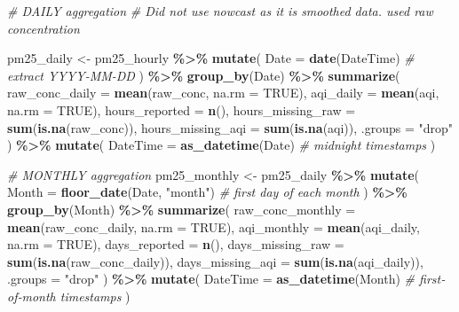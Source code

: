 \documentclass[
]{article}
\newenvironment{Shaded}{\begin{snugshade}}{\end{snugshade}}
\newcommand{\AttributeTok}[1]{\textcolor[rgb]{0.13,0.29,0.53}{#1}}
\newcommand{\CommentTok}[1]{\textcolor[rgb]{0.56,0.35,0.01}{\textit{#1}}}
\newcommand{\ConstantTok}[1]{\textcolor[rgb]{0.56,0.35,0.01}{#1}}
\newcommand{\FunctionTok}[1]{\textcolor[rgb]{0.13,0.29,0.53}{\textbf{#1}}}
\newcommand{\NormalTok}[1]{#1}
\newcommand{\OtherTok}[1]{\textcolor[rgb]{0.56,0.35,0.01}{#1}}
\newcommand{\SpecialCharTok}[1]{\textcolor[rgb]{0.81,0.36,0.00}{\textbf{#1}}}
\newcommand{\StringTok}[1]{\textcolor[rgb]{0.31,0.60,0.02}{#1}}
\begin{document}
\begin{Shaded}
\begin{Highlighting}[]
\CommentTok{\# DAILY aggregation}
\CommentTok{\# Did not use nowcast as it is smoothed data. used raw concentration}

\NormalTok{pm25\_daily }\OtherTok{\textless{}{-}}\NormalTok{ pm25\_hourly }\SpecialCharTok{\%\textgreater{}\%}
  \FunctionTok{mutate}\NormalTok{(}
    \AttributeTok{Date     =} \FunctionTok{date}\NormalTok{(DateTime)                }\CommentTok{\# extract YYYY{-}MM{-}DD}
\NormalTok{  ) }\SpecialCharTok{\%\textgreater{}\%}
  \FunctionTok{group\_by}\NormalTok{(Date) }\SpecialCharTok{\%\textgreater{}\%}
  \FunctionTok{summarize}\NormalTok{(}
    \AttributeTok{raw\_conc\_daily    =} \FunctionTok{mean}\NormalTok{(raw\_conc, }\AttributeTok{na.rm =} \ConstantTok{TRUE}\NormalTok{),}
    \AttributeTok{aqi\_daily         =} \FunctionTok{mean}\NormalTok{(aqi,      }\AttributeTok{na.rm =} \ConstantTok{TRUE}\NormalTok{),}
    \AttributeTok{hours\_reported    =} \FunctionTok{n}\NormalTok{(),}
    \AttributeTok{hours\_missing\_raw =} \FunctionTok{sum}\NormalTok{(}\FunctionTok{is.na}\NormalTok{(raw\_conc)),}
    \AttributeTok{hours\_missing\_aqi =} \FunctionTok{sum}\NormalTok{(}\FunctionTok{is.na}\NormalTok{(aqi)),}
    \AttributeTok{.groups =} \StringTok{"drop"}
\NormalTok{  ) }\SpecialCharTok{\%\textgreater{}\%}
  \FunctionTok{mutate}\NormalTok{(}
    \AttributeTok{DateTime =} \FunctionTok{as\_datetime}\NormalTok{(Date)             }\CommentTok{\# midnight timestamps}
\NormalTok{  )}

\CommentTok{\# MONTHLY aggregation}
\NormalTok{pm25\_monthly }\OtherTok{\textless{}{-}}\NormalTok{ pm25\_daily }\SpecialCharTok{\%\textgreater{}\%}
  \FunctionTok{mutate}\NormalTok{(}
    \AttributeTok{Month =} \FunctionTok{floor\_date}\NormalTok{(Date, }\StringTok{"month"}\NormalTok{)        }\CommentTok{\# first day of each month}
\NormalTok{  ) }\SpecialCharTok{\%\textgreater{}\%}
  \FunctionTok{group\_by}\NormalTok{(Month) }\SpecialCharTok{\%\textgreater{}\%}
  \FunctionTok{summarize}\NormalTok{(}
    \AttributeTok{raw\_conc\_monthly   =} \FunctionTok{mean}\NormalTok{(raw\_conc\_daily, }\AttributeTok{na.rm =} \ConstantTok{TRUE}\NormalTok{),}
    \AttributeTok{aqi\_monthly        =} \FunctionTok{mean}\NormalTok{(aqi\_daily,      }\AttributeTok{na.rm =} \ConstantTok{TRUE}\NormalTok{),}
    \AttributeTok{days\_reported      =} \FunctionTok{n}\NormalTok{(),}
    \AttributeTok{days\_missing\_raw   =} \FunctionTok{sum}\NormalTok{(}\FunctionTok{is.na}\NormalTok{(raw\_conc\_daily)),}
    \AttributeTok{days\_missing\_aqi   =} \FunctionTok{sum}\NormalTok{(}\FunctionTok{is.na}\NormalTok{(aqi\_daily)),}
    \AttributeTok{.groups =} \StringTok{"drop"}
\NormalTok{  ) }\SpecialCharTok{\%\textgreater{}\%}
  \FunctionTok{mutate}\NormalTok{(}
    \AttributeTok{DateTime =} \FunctionTok{as\_datetime}\NormalTok{(Month)            }\CommentTok{\# first‐of‐month timestamps}
\NormalTok{  )}


\end{Highlighting}
\end{Shaded}
\end{document}
